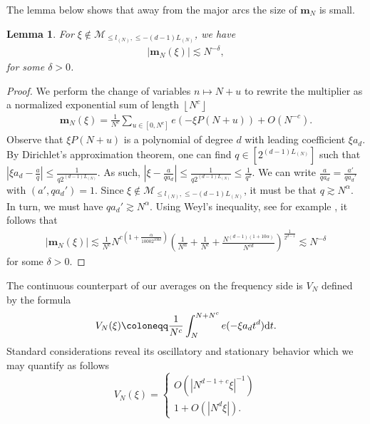 \documentclass[12pt,leqno]{amsart}
\def\d{{\rm d}}
\newcounter{counter}
\newcounter{counter2}
\numberwithin{equation}{section}
\numberwithin{counter2}{section}
\newcounter{theorem}
\newtheorem{lemma}[subsection]{Lemma}
\theoremstyle{definition}
\theoremstyle{plain}
\newcommand{\floor}[1]{\left\lfloor #1 \right\rfloor}
\begin{document}
	The lemma below shows that away from the major arcs the size of $\mathbf{m}_N$ is small.  
	\begin{lemma}\label{l:minorarcalldegree}
		For $\xi \notin \mathcal{M}_{\leq l_{(N)}, \leq -(d-1)L_{(N)}}$, we have
		\begin{align*}
			\left| \mathbf{m}_N(\xi)\right| \lesssim N^{-\delta}, 
		\end{align*}
		for some $\delta >0$. 
	\end{lemma}
	\begin{proof}
		We perform the change of variables $n \mapsto N+u$ to rewrite the multiplier as a normalized exponential sum of length $\floor{N^c}$
		\begin{align*}
			\mathbf{m}_N(\xi)= \frac{1}{N^c} \sum_{u \in [0,N^c]} e \left(-\xi P(N+u) \right)+O(N^{-c}).
		\end{align*}
		Observe that $\xi P(N+u)$ is a polynomial of degree $d$ with leading coefficient $\xi a_d$. By Dirichlet's approximation theorem, one can find  $ q \in \left[2^{(d-1)L_{(N)}}\right]$ such that $\left| \xi a_d-\frac{a}{q} \right| \leq \frac{1}{q2^{(d-1)L_{(N)}}}$. As such, $ \left| \xi-\frac{a}{qa_d} \right| \leq \frac{1}{q2^{(d-1)L_{(N)}}} \leq \frac{1}{q^2}$. We can write $\frac{a}{qa_d}=\frac{a'}{q a_d'}$ with $(a',qa_d')=1$. Since $\xi \not \in \mathcal{M}_{\leq l_{(N)}, \leq -(d-1)L_{(N)}}$, it must be that $q \gtrsim N^{\alpha}$. In turn, we must have $q a_d' \gtrsim N^{\alpha}.$ Using Weyl's inequality, see for example  \cite[Theorem 4.3]{Nathanson1996}, it follows that 
		\begin{align*}
			|\mathbf{m}_N(\xi)| \lesssim   \frac{1}{N^c} N^{c(1+\frac{\alpha}{10002^{100d}})} \left( \frac{1}{N^{\alpha}} +\frac{1}{N^c}+\frac{N^{(d-1)(1+10\alpha)}}{N^{cd}} \right)^{\frac{1}{2^{d-1}}} \lesssim N^{-\delta}
		\end{align*}
		for some $\delta>0$. 
	\end{proof}
	The continuous counterpart of our averages on the frequency side is $V_N$ defined by the formula \begin{align*}
		V_N(\xi) \coloneqq  \frac{1}{N^c}  \int_{N}^{N+N^c}e(-\xi a_d t^d) \d t. 
	\end{align*} Standard considerations reveal its oscillatory and stationary behavior which we may quantify as follows \begin{equation}
		\label{eq:vn}
		V_{N}(\xi)= \begin{cases}
			O\left ( \left| N^{d-1+c} \xi  \right|^{-1} \right) \\ 
			1+O\left (|N^d\xi| \right ). 
		\end{cases}
	\end{equation}
\end{document}
